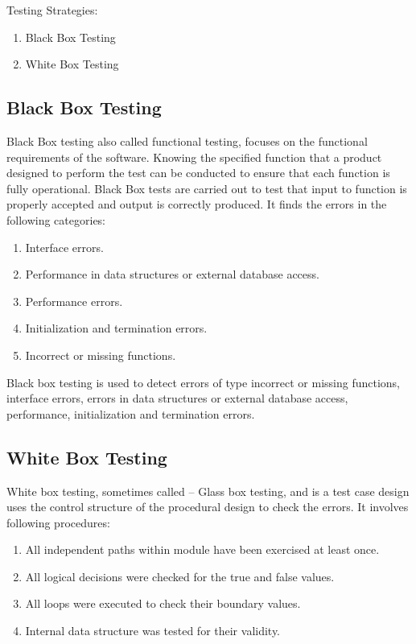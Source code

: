\documentclass[12pt]{report} %
\begin{document}
Testing Strategies: 
\begin{enumerate}
	\item Black Box Testing
	\item White Box Testing
\end{enumerate}

\subsection{Black Box Testing}
\label{subsec:Black Box Testing}

Black Box testing also called functional testing, focuses on the functional requirements of the software. Knowing the specified function that a product designed to perform the test can be conducted to ensure that each function is fully operational. Black Box tests are carried out to test that input to function is properly accepted and output is correctly produced. It finds the errors in the following categories:

\begin{enumerate}
	\item Interface errors.
	\item Performance in data structures or external database access.
	\item Performance errors.
	\item Initialization and termination errors.
	\item Incorrect or missing functions.
\end{enumerate}

Black box testing is used to detect errors of type incorrect or missing functions, interface errors, errors in data structures or external database access, performance, initialization and termination errors. 

\subsection{White Box Testing}
\label{subsec:White Box Testing}

White box testing, sometimes called -- Glass box testing, and is a test case design uses the control structure of the procedural design to check the errors. It involves following procedures: 

\begin{enumerate}
	\item All independent paths within module have been exercised at least once.
	\item All logical decisions were checked for the true and false values.
	\item All loops were executed to check their boundary values. 
	\item Internal data structure was tested for their validity. 
\end{enumerate}
\end{document}
